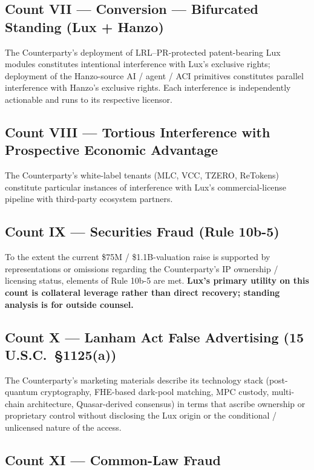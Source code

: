 \documentclass[11pt,letterpaper]{article}
\begin{document}
\subsection*{Count VII --- Conversion --- Bifurcated Standing (Lux + Hanzo)}

The Counterparty's deployment of LRL--PR-protected patent-bearing
Lux modules constitutes intentional interference with Lux's
exclusive rights; deployment of the Hanzo-source AI / agent / ACI
primitives constitutes parallel interference with Hanzo's
exclusive rights. Each interference is independently actionable
and runs to its respective licensor.

\subsection*{Count VIII --- Tortious Interference with Prospective Economic Advantage}

The Counterparty's white-label tenants (MLC, VCC, TZERO, ReTokens)
constitute particular instances of interference with Lux's
commercial-license pipeline with third-party ecosystem partners.

\subsection*{Count IX --- Securities Fraud (Rule 10b-5)}

To the extent the current \$75M / \$1.1B-valuation raise is supported by representations or
omissions regarding the Counterparty's IP ownership / licensing
status, elements of Rule 10b-5 are met. \textbf{Lux's primary
utility on this count is collateral leverage rather than direct
recovery; standing analysis is for outside counsel.}

\subsection*{Count X --- Lanham Act False Advertising (15 U.S.C.\ \S 1125(a))}

The Counterparty's marketing materials describe its technology stack
(post-quantum cryptography, FHE-based dark-pool matching, MPC
custody, multi-chain architecture, Quasar-derived consensus) in
terms that ascribe ownership or proprietary control without
disclosing the Lux origin or the conditional / unlicensed nature of
the access.

\subsection*{Count XI --- Common-Law Fraud}
\end{document}
